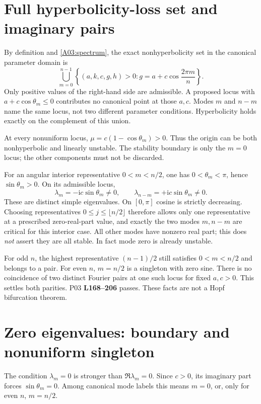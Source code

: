 \documentclass[11pt]{article}
\newcommand{\lin}[1]{\textbf{L#1}}
\begin{document}
\section{Full hyperbolicity-loss set and imaginary pairs}
By definition and \eqref{A03:spectrum}, the exact nonhyperbolicity set in the
canonical parameter domain is
\begin{equation}
 \bigcup_{m=0}^{n-1}
 \left\{(a,k,c,g,h)>0:
       g=a+c\cos\frac{2\pi m}{n}\right\}.\label{A03:nonhyp}
\end{equation}
Only positive values of the right-hand side are admissible. A proposed locus
with $a+c\cos\theta_m\le0$ contributes no canonical point at those $a,c$.
Modes $m$ and $n-m$ name the same locus, not two different parameter
conditions. Hyperbolicity holds exactly on the complement of this union.

At every nonuniform locus,
$\mu=c(1-\cos\theta_m)>0$. Thus the origin can be both nonhyperbolic and
linearly unstable. The stability boundary is only the $m=0$ locus;
the other components must not be discarded.

For an angular interior representative $0<m<n/2$, one has
$0<\theta_m<\pi$, hence $\sin\theta_m>0$. On its admissible locus,
\[
 \lambda_m=-\mathrm i c\sin\theta_m\ne0,\qquad
 \lambda_{n-m}=+\mathrm i c\sin\theta_m\ne0.
\]
These are distinct simple eigenvalues. On $[0,\pi]$ cosine is strictly
decreasing. Choosing representatives $0\le j\le\lfloor n/2\rfloor$
therefore allows only one representative at a prescribed zero-real-part
value, and exactly the two modes $m,n-m$ are critical for this interior case.
All other modes have nonzero real part; this does \emph{not} assert they
are all stable. In fact mode zero is already unstable.

For odd $n$, the highest representative $(n-1)/2$ still satisfies
$0<m<n/2$ and belongs to a pair. For even $n$, $m=n/2$ is a singleton
with zero sine. There is no coincidence of two distinct Fourier pairs at
one such locus for fixed $a,c>0$. This settles both parities. P03
\lin{168--206} passes. These facts are not a Hopf bifurcation theorem.

\section{Zero eigenvalues: boundary and nonuniform singleton}
The condition $\lambda_m=0$ is stronger than $\Re\lambda_m=0$. Since
$c>0$, its imaginary part forces $\sin\theta_m=0$. Among canonical mode
labels this means $m=0$, or, only for even $n$, $m=n/2$.
\end{document}

